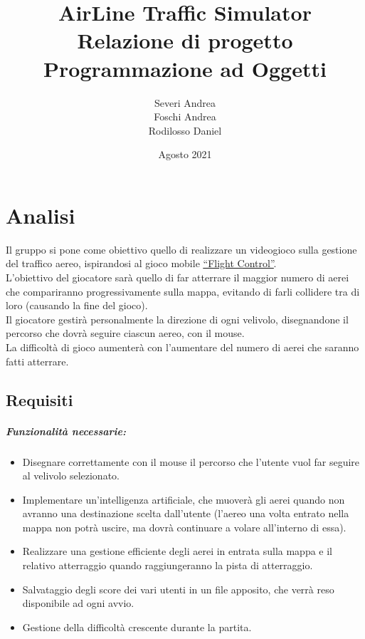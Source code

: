 \documentclass[a4paper,12pt]{report}
\title{
\textbf{AirLine Traffic Simulator}
\\Relazione di progetto
\\Programmazione ad Oggetti
}
\date{Agosto 2021}
\author{
Severi Andrea
\\Foschi Andrea
\\Rodilosso Daniel
}
\begin{document}
\maketitle

\tableofcontents

\chapter{Analisi}
Il gruppo si pone come obiettivo quello di realizzare un videogioco sulla gestione del traffico aereo, ispirandosi al gioco mobile \href{https://youtu.be/KTH084KeFBc}{\underline{“Flight Control”}}.
\\
L’obiettivo del giocatore sarà quello di far atterrare il maggior numero di aerei che compariranno progressivamente sulla mappa, evitando di farli collidere tra di loro (causando la fine del gioco).
\\
Il giocatore gestirà personalmente la direzione di ogni velivolo, disegnandone il percorso che dovrà seguire ciascun aereo, con il mouse.
\\
La difficoltà di gioco aumenterà con l’aumentare del numero di aerei che saranno fatti atterrare.

\section{Requisiti}
\paragraph{Funzionalità necessarie:}

\begin{itemize}
    \item Disegnare correttamente con il mouse il percorso che l’utente vuol far seguire al velivolo selezionato.
    
    \item Implementare un’intelligenza artificiale, che muoverà gli aerei quando non avranno una destinazione scelta dall’utente (l’aereo una volta entrato nella mappa non potrà uscire, ma dovrà continuare a volare all’interno di essa).
    
    \item Realizzare una gestione efficiente degli aerei in entrata sulla mappa e il relativo atterraggio quando raggiungeranno la pista di atterraggio.
    
    \item Salvataggio degli score dei vari utenti in un file apposito, che verrà reso disponibile ad ogni avvio.
    
    \item Gestione della difficoltà crescente durante la partita.
\end{itemize}
\end{document}
